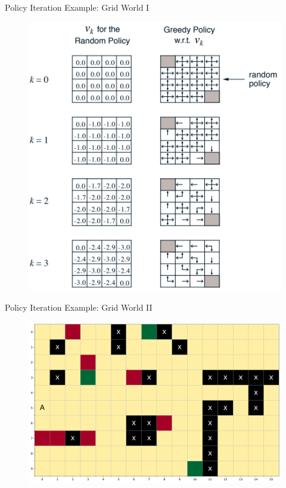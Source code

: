 \begin{frame}[plain]{Policy Iteration Example: Grid World I}{}
	\begin{figure}
		\centering
		\includegraphics[scale=0.275]{14_rl/02_img/policy_iteration_gridworld}
	\end{figure}
\end{frame}


\begin{frame}[plain]{Policy Iteration Example: Grid World II}{}
	\begin{figure}
		\centering
		\includegraphics[scale=0.3]{14_rl/02_img/grid_world}
	\end{figure}
\end{frame}



